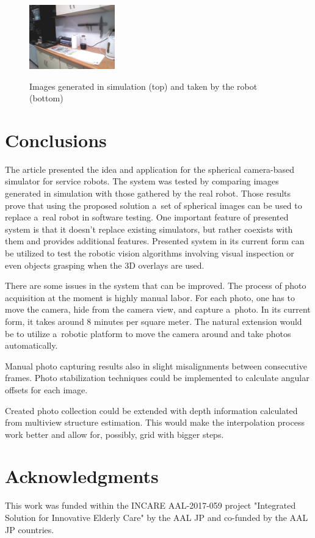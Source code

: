 \documentclass{svproc}
\begin{document}
\begin{figure}[!ht]
    \includegraphics[width=0.33\textwidth]{img/sim_vs_tiago/tia_kuchnia_blat.jpg}\\
    \caption{Images generated in simulation (top) and taken by the robot (bottom)}
    \label{fig:sim_vs_tiago}
\end{figure}\vspace{-5mm}

\section{Conclusions}

The article presented the idea and application for the spherical camera-based 
simulator for service robots. The system was tested by comparing images generated in simulation
with those gathered by the real robot. Those results prove that using the proposed solution a~set 
of spherical images can be used to replace a~real robot in software testing.
One important feature of presented system is that it doesn't replace existing simulators,
but rather coexists with them and provides additional features.
Presented system in its current form can be utilized to test the robotic vision algorithms
involving visual inspection \cite{mmar_winiarski_automated-2016} or even objects
grasping \cite{seredynski2016fast} when the 3D overlays are used. 

There are some issues in the system that can be improved. The process of photo acquisition
at the moment is highly manual labor. For each photo, one has to move the camera, hide from
the camera view, and capture a~photo. In its current form, it takes around 8 minutes per square meter.
The natural extension would be to utilize a~robotic platform to move the camera around and
take photos automatically. 

Manual photo capturing results also in slight misalignments between consecutive frames.
Photo stabilization techniques could be implemented to calculate angular offsets for each
image.

Created photo collection could be extended with depth information calculated from multiview
structure estimation. This would make the interpolation process work better and allow for, 
possibly, grid with bigger steps.

\section*{Acknowledgments}
\label{sec:acknowledgments}
This work was funded within the INCARE AAL-2017-059 project "Integrated Solution for Innovative Elderly
Care" by the AAL JP and co-funded by the AAL JP countries.

 

\end{document}
